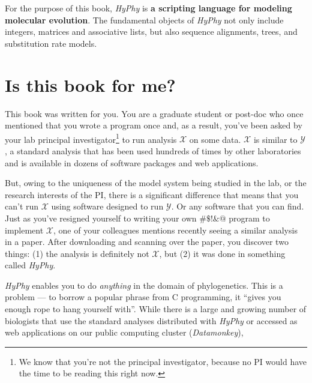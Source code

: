 \documentclass[12pt]{book}
\newcommand{\hyphy}{\textit{HyPhy }}
\begin{document}
For the purpose of this book, \hyphy is {\bf a scripting language for modeling molecular evolution}.  The fundamental objects of \hyphy not only include integers, matrices and associative lists, but also sequence alignments, trees, and substitution rate models.

\section {Is this book for me?}

This book was written for you.  You are a graduate student or post-doc who once mentioned that you wrote a program once and, as a result, you've been asked by your lab principal investigator\footnote{We know that you're not the principal investigator, because no PI would have the time to be reading this right now.} to run analysis $\mathcal{X}$ on some data.  $\mathcal{X}$ is similar to $\mathcal{Y}$, a standard analysis that has been used hundreds of times by other laboratories and is available in dozens of software packages and web applications.  

But, owing to the uniqueness of the model system being studied in the lab, or the research interests of the PI, there is a significant difference that means that you can't run $\mathcal{X}$ using software designed to run $\mathcal{Y}$.  Or any software that you can find.  Just as you've resigned yourself to writing your own $\#\$!\&@$ program to implement $\mathcal{X}$, one of your colleagues mentions recently seeing a similar analysis in a paper.  After downloading and scanning over the paper, you discover two things: (1) the analysis is definitely not $\mathcal{X}$, but (2) it was done in something called {\it HyPhy}.  

\hyphy enables you to do {\it anything} in the domain of phylogenetics.  This is a problem --- to borrow a popular phrase from C programming, it ``gives you enough rope to hang yourself with''.  While there is a large and growing number of biologists that use the standard analyses distributed with \hyphy or accessed as web applications on our public computing cluster ({\it Datamonkey}), 
\end{document}
